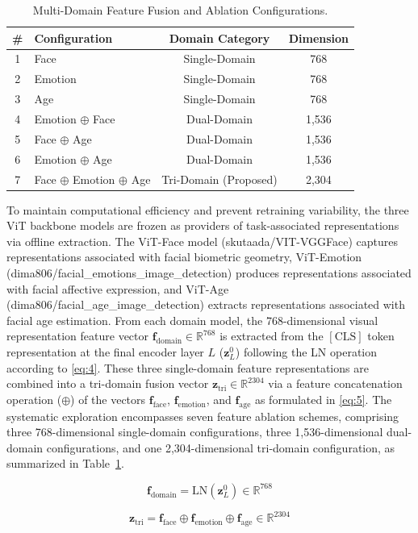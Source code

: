 \begin{table}[htbp]
\caption{Multi-Domain Feature Fusion and Ablation Configurations.}
\label{tab:II}
\centering
\begin{tabular}{clcc}
\toprule
\# & Configuration & Domain Category & Dimension \\
\midrule
1 & Face & Single-Domain & 768 \\
2 & Emotion & Single-Domain & 768 \\
3 & Age & Single-Domain & 768 \\
4 & Emotion $\oplus$ Face & Dual-Domain & 1,536 \\
5 & Face $\oplus$ Age & Dual-Domain & 1,536 \\
6 & Emotion $\oplus$ Age & Dual-Domain & 1,536 \\
7 & Face $\oplus$ Emotion $\oplus$ Age & Tri-Domain (Proposed) & 2,304 \\
\bottomrule
\end{tabular}
\end{table}

To maintain computational efficiency and prevent retraining variability, the three ViT backbone models are frozen as providers of task-associated representations via offline extraction. The ViT-Face model (skutaada/\allowbreak VIT-\allowbreak VGGFace) captures representations associated with facial biometric geometry, ViT-Emotion (dima806/\allowbreak facial\_\allowbreak emotions\_\allowbreak image\_\allowbreak detection) produces representations associated with facial affective expression, and ViT-Age (dima806/\allowbreak facial\_\allowbreak age\_\allowbreak image\_\allowbreak detection) extracts representations associated with facial age estimation. From each domain model, the 768-dimensional visual representation feature vector $\mathbf{f}_{\text{domain}} \in \mathbb{R}^{768}$ is extracted from the $[\text{CLS}]$ token representation at the final encoder layer $L$ ($\mathbf{z}_L^0$) following the LN operation according to \eqref{eq:4}. These three single-domain feature representations are combined into a tri-domain fusion vector $\mathbf{z}_{\text{tri}} \in \mathbb{R}^{2304}$ via a feature concatenation operation ($\oplus$) of the vectors $\mathbf{f}_{\text{face}}$, $\mathbf{f}_{\text{emotion}}$, and $\mathbf{f}_{\text{age}}$ as formulated in \eqref{eq:5}. The systematic exploration encompasses seven feature ablation schemes, comprising three 768-dimensional single-domain configurations, three 1,536-dimensional dual-domain configurations, and one 2,304-dimensional tri-domain configuration, as summarized in Table~\ref{tab:II}.

\begin{equation}
\mathbf{f}_{\text{domain}} = \text{LN}(\mathbf{z}_L^0) \in \mathbb{R}^{768}
\label{eq:4}
\end{equation}

\begin{equation}
\mathbf{z}_{\text{tri}} = \mathbf{f}_{\text{face}} \oplus \mathbf{f}_{\text{emotion}} \oplus \mathbf{f}_{\text{age}} \in \mathbb{R}^{2304}
\label{eq:5}
\end{equation}
